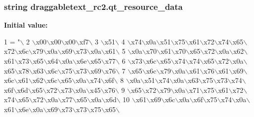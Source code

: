 \subsubsection[{qt\+\_\+resource\+\_\+data}]{\setlength{\rightskip}{0pt plus 5cm}string draggabletext\+\_\+rc2.\+qt\+\_\+resource\+\_\+data}\label{namespacedraggabletext__rc2_a5859a400598a9e9e58b3166e4932c7e4}
{\bfseries Initial value\+:}
\begin{DoxyCode}
1 = \textcolor{stringliteral}{"\(\backslash\)}
2 \textcolor{stringliteral}{\(\backslash\)x00\(\backslash\)x00\(\backslash\)x00\(\backslash\)xf7\(\backslash\)}
3 \textcolor{stringliteral}{\(\backslash\)x51\(\backslash\)}
4 \textcolor{stringliteral}{\(\backslash\)x74\(\backslash\)x0a\(\backslash\)x51\(\backslash\)x75\(\backslash\)x61\(\backslash\)x72\(\backslash\)x74\(\backslash\)x65\(\backslash\)x72\(\backslash\)x6c\(\backslash\)x79\(\backslash\)x0a\(\backslash\)x69\(\backslash\)x73\(\backslash\)x0a\(\backslash\)x61\(\backslash\)}
5 \textcolor{stringliteral}{\(\backslash\)x0a\(\backslash\)x70\(\backslash\)x61\(\backslash\)x70\(\backslash\)x65\(\backslash\)x72\(\backslash\)x0a\(\backslash\)x62\(\backslash\)x61\(\backslash\)x73\(\backslash\)x65\(\backslash\)x64\(\backslash\)x0a\(\backslash\)x6e\(\backslash\)x65\(\backslash\)x77\(\backslash\)}
6 \textcolor{stringliteral}{\(\backslash\)x73\(\backslash\)x6c\(\backslash\)x65\(\backslash\)x74\(\backslash\)x74\(\backslash\)x65\(\backslash\)x72\(\backslash\)x0a\(\backslash\)x65\(\backslash\)x78\(\backslash\)x63\(\backslash\)x6c\(\backslash\)x75\(\backslash\)x73\(\backslash\)x69\(\backslash\)x76\(\backslash\)}
7 \textcolor{stringliteral}{\(\backslash\)x65\(\backslash\)x6c\(\backslash\)x79\(\backslash\)x0a\(\backslash\)x61\(\backslash\)x76\(\backslash\)x61\(\backslash\)x69\(\backslash\)x6c\(\backslash\)x61\(\backslash\)x62\(\backslash\)x6c\(\backslash\)x65\(\backslash\)x0a\(\backslash\)x74\(\backslash\)x6f\(\backslash\)}
8 \textcolor{stringliteral}{\(\backslash\)x0a\(\backslash\)x51\(\backslash\)x74\(\backslash\)x0a\(\backslash\)x63\(\backslash\)x75\(\backslash\)x73\(\backslash\)x74\(\backslash\)x6f\(\backslash\)x6d\(\backslash\)x65\(\backslash\)x72\(\backslash\)x73\(\backslash\)x0a\(\backslash\)x45\(\backslash\)x76\(\backslash\)}
9 \textcolor{stringliteral}{\(\backslash\)x65\(\backslash\)x72\(\backslash\)x79\(\backslash\)x0a\(\backslash\)x71\(\backslash\)x75\(\backslash\)x61\(\backslash\)x72\(\backslash\)x74\(\backslash\)x65\(\backslash\)x72\(\backslash\)x0a\(\backslash\)x77\(\backslash\)x65\(\backslash\)x0a\(\backslash\)x6d\(\backslash\)}
10 \textcolor{stringliteral}{\(\backslash\)x61\(\backslash\)x69\(\backslash\)x6c\(\backslash\)x0a\(\backslash\)x6f\(\backslash\)x75\(\backslash\)x74\(\backslash\)x0a\(\backslash\)x61\(\backslash\)x6e\(\backslash\)x0a\(\backslash\)x69\(\backslash\)x73\(\backslash\)x73\(\backslash\)x75\(\backslash\)x65\(\backslash\)}

\end{DoxyCode}

